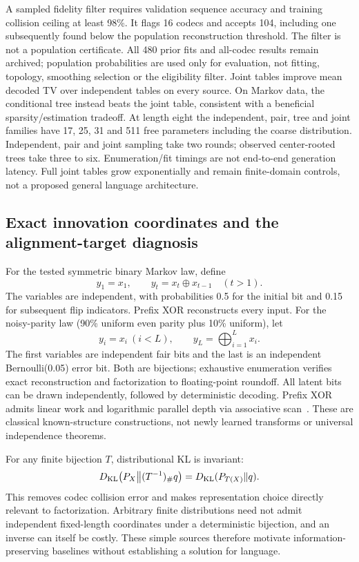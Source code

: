 A sampled fidelity filter requires validation sequence accuracy and training
collision ceiling at least 98\%. It flags 16 codecs and accepts 104, including
one subsequently found below the population reconstruction threshold. The
filter is not a population certificate. All 480 prior fits and all-codec
results remain archived; population probabilities are used only for evaluation,
not fitting, topology, smoothing selection or the eligibility filter.
\RecentPriorTable
Joint tables improve mean decoded TV over independent tables on every source.
On Markov data, the conditional tree instead beats the joint table, consistent
with a beneficial sparsity/estimation tradeoff. At length eight the independent,
pair, tree and joint families have 17, 25, 31 and 511 free parameters including
the coarse distribution. Independent, pair and joint sampling take two rounds;
observed center-rooted trees take three to six. Enumeration/fit timings are not
end-to-end generation latency. Full joint tables grow exponentially and remain
finite-domain controls, not a proposed general language architecture.

\subsection{Exact innovation coordinates and the alignment-target diagnosis}
For the tested symmetric binary Markov law, define
\begin{equation}
 y_1=x_1,\qquad y_t=x_t\oplus x_{t-1}\quad(t>1).
\end{equation}
The variables are independent, with probabilities 0.5 for the initial bit and
0.15 for subsequent flip indicators. Prefix XOR reconstructs every input.
For the noisy-parity law (90\% uniform even parity plus 10\% uniform), let
\begin{equation}
 y_i=x_i\ (i<L),\qquad y_L=\bigoplus_{i=1}^{L}x_i.
\end{equation}
The first variables are independent fair bits and the last is an independent
Bernoulli(0.05) error bit. Both are bijections; exhaustive enumeration verifies
exact reconstruction and factorization to floating-point roundoff. All latent
bits can be drawn independently, followed by deterministic decoding. Prefix
XOR admits linear work and logarithmic parallel depth via associative
scan~\citep{blelloch1993}. These are classical known-structure constructions,
not newly learned transforms or universal independence theorems.

For any finite bijection \(T\), distributional KL is invariant:
\begin{equation}
 D_{\rm KL}\!\left(P_X\middle\|(T^{-1})_\#q\right)
 =D_{\rm KL}(P_{T(X)}\|q).
\end{equation}
This removes codec collision error and makes representation choice directly
relevant to factorization. Arbitrary finite distributions need not admit
independent fixed-length coordinates under a deterministic bijection, and an
inverse can itself be costly. These simple sources therefore motivate
information-preserving baselines without establishing a solution for language.

